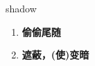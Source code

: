 
\begin{frame}
{\huge shadow}
\begin{center}
\begin{enumerate}\Large
  \item \textbf{偷偷尾随}
  \item \textbf{遮蔽，(使)变暗}
\end{enumerate}
\end{center}
\end{frame}

